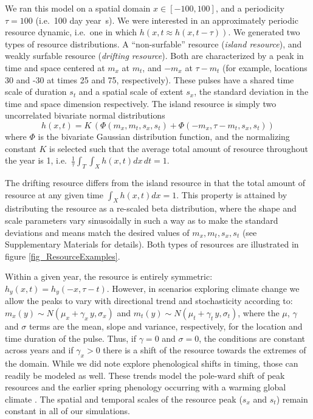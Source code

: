 \documentclass[utf8]{frontiersSCNS} %
\begin{document}
	We ran this model on a spatial domain $x \in [-100,100]$, and a periodicity $\tau = 100$ (i.e.~100 day year~s). We were interested in an approximately periodic resource dynamic, i.e.~one in which $h(x,t \approx h(x, t-\tau))$. We generated two types of resource distributions. A ``non-surfable'' resource (\emph{island resource}), and weakly surfable resource (\emph{drifting resource}). Both are characterized by a peak in time and space centered at $m_x$ at $m_t$, and $-m_x$ at $\tau - m_t$ (for example, locations 30 and -30 at times 25 and 75, respectively). These pulses have a shared time scale of duration $s_t$ and a spatial scale of extent $s_x$, the standard deviation in the time and space dimension respectively. The island resource is simply two uncorrelated bivariate normal
	distributions 
	$$h(x,t) = K\,(\Phi(m_x, m_t, s_x, s_t) + \Phi(-m_x, \tau - m_t, s_x, s_t))$$ 
	\noindent where $\Phi$ is the bivariate Gaussian distribution function, and the normalizing constant $K$ is selected such that the average total amount of resource throughout the year is 1, i.e.~$\frac{1}{\tau} \int_T\int_X h(x,t) dx\,dt = 1$.
	
	The drifting resource differs from the island resource in that the total amount of resource at any given time $\int_X h(x,t) dx = 1$. This property is attained by distributing the resource as a re-scaled beta distribution, where the shape and scale parameters vary sinusoidally in such a way as to make the standard deviations and means match the desired values of $m_x, m_t, s_x, s_t$ (see Supplementary Materials for details). Both types of resources are illustrated in figure \ref{fig_ResourceExamples}.
	
	Within a given year, the resource is entirely symmetric: $h_y(x,t) = h_y(-x, \tau-t)$. However, in scenarios exploring climate change we allow the peaks to vary with directional trend and stochasticity according to: $m_x(y) \sim {N}(\mu_x + \gamma_x\,y, \sigma_x)$ and $m_t(y) \sim {N}(\mu_t + \gamma_t\,y, \sigma_t)$, where the $\mu$, $\gamma$ and $\sigma$ terms are the mean, slope and variance, respectively, for the location and time duration of the pulse. Thus, if $\gamma=0$ and $\sigma=0$, the conditions are constant across years and if $\gamma_x > 0$ there is a shift of the resource towards the extremes of the domain. While we did note explore phenological shifts in timing, those can readily be modeled as well. These trends model the pole-ward shift of peak resources and the earlier spring phenology occurring with a warming global climate \citep{Renner2018}. The spatial and temporal scales of the resource peak ($s_x$ and $s_t$) remain constant in all of our simulations. 
	
\end{document}
